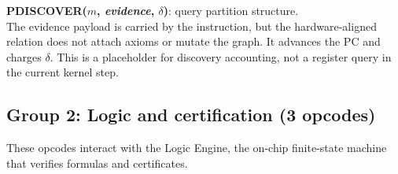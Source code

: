 \documentclass[11pt,a4paper]{article}
\theoremstyle{plain}
\theoremstyle{definition}
\theoremstyle{remark}
\begin{document}
\medskip
\noindent\textbf{PDISCOVER($m$, \textit{evidence}, $\delta$)}: query partition structure.\\
The evidence payload is carried by the instruction, but the hardware-aligned relation does not attach axioms or mutate the graph. It advances the PC and charges $\delta$. This is a placeholder for discovery accounting, not a register query in the current kernel step.

\subsection{Group 2: Logic and certification (3 opcodes)}

These opcodes interact with the Logic Engine, the on-chip finite-state machine that verifies formulas and certificates.
\end{document}
